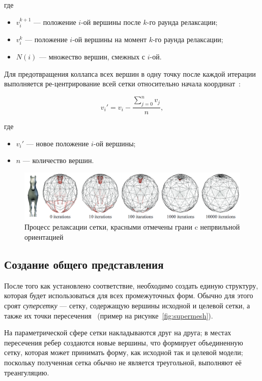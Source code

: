 	где
	\begin{itemize}
		\item $v_i^{k + 1}$ --- положение $i$-ой вершины после $k$-го раунда релаксации;
		\item $v_i^{k}$ --- положение $i$-ой вершины на момент $k$-го раунда релаксации;
		\item $N(i)$ --- множество вершин, смежных с $i$-ой.
	\end{itemize}
	
	Для предотвращения коллапса всех вершин в одну точку после каждой итерации выполняется ре-центрирование всей сетки относительно начала координат~\cite{alexa}:
	
	\begin{equation}
		v_i' = v_i - \frac{\sum_{j = 0}^{n} v_j}{n},
	\end{equation}
	
	где
	\begin{itemize}
		\item $v_i'$ --- новое положение $i$-ой вершины;
		\item $n$ --- количество вершин.
	\end{itemize}
	
	\begin{figure}[H]
		\centering
		\includegraphics[width=\textwidth]{../inc/images/relaxation}
		\caption{Процесс релаксации сетки, красными отмечены грани c непрвильной ориентацией}
		\label{fig:relaxation}
	\end{figure}
	
    \subsection{Создание общего представления}
    После того как установлено соответствие, необходимо создать единую структуру, которая будет использоваться для всех промежуточных форм. Обычно для этого сроят \textit{суперсетку} --- сетку, содержащую вершины исходной и целевой сетки, а также их точки пересечения~\cite{mocanu,alexa} (пример на рисунке~\ref{fig:supermesh}).
    
    На параметрической сфере сетки накладываются друг на друга; в местах пересечения ребер создаются новые вершины, что формирует объединенную сетку, которая может принимать форму, как исходной так и целевой модели; поскольку полученная сетка обычно не является треугольной, выполняют её треангуляцию.
    
